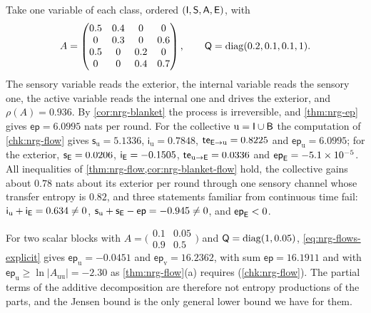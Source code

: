 \begin{example}\label{ex:nrg-blanket-instance}
Take one variable of each class, ordered $(\mathsf{I},\mathsf{S},\mathsf{A},\mathsf{E})$, with
\[
A=\begin{pmatrix}0.5&0.4&0&0\\0&0.3&0&0.6\\0.5&0&0.2&0\\0&0&0.4&0.7\end{pmatrix},\qquad\mathsf Q=\operatorname{diag}(0.2,0.1,0.1,1).
\]
The sensory variable reads the exterior, the internal variable reads the sensory one, the active variable reads the internal one and drives the exterior, and $\rho(A)=0.936$. By \cref{cor:nrg-blanket} the process is irreversible, and \cref{thm:nrg-ep} gives $\mathsf{ep}=6.0995$ nats per round. For the collective $\mathrm u=\mathsf{I}\cup\mathsf{B}$ the computation of \cref{chk:nrg-flow} gives $\mathsf s_{\mathrm u}=5.1336$, $\mathsf i_{\mathrm u}=0.7848$, $\mathsf{te}_{\mathsf{E}\to\mathrm u}=0.8225$ and $\mathsf{ep}_{\mathrm u}=6.0995$; for the exterior, $\mathsf s_{\mathsf{E}}=0.0206$, $\mathsf i_{\mathsf{E}}=-0.1505$, $\mathsf{te}_{\mathrm u\to\mathsf{E}}=0.0336$ and $\mathsf{ep}_{\mathsf{E}}=-5.1\times10^{-5}$. All inequalities of \cref{thm:nrg-flow,cor:nrg-blanket-flow} hold, the collective gains about $0.78$ nats about its exterior per round through one sensory channel whose transfer entropy is $0.82$, and three statements familiar from continuous time fail: $\mathsf i_{\mathrm u}+\mathsf i_{\mathsf{E}}=0.634\neq0$, $\mathsf s_{\mathrm u}+\mathsf s_{\mathsf{E}}-\mathsf{ep}=-0.945\neq0$, and $\mathsf{ep}_{\mathsf{E}}<0$.
\end{example}

\begin{example}\label{ex:nrg-negative-partial}
For two scalar blocks with $A=\bigl(\begin{smallmatrix}0.1&0.05\\0.9&0.5\end{smallmatrix}\bigr)$ and $\mathsf Q=\operatorname{diag}(1,0.05)$, \cref{eq:nrg-flows-explicit} gives $\mathsf{ep}_{\mathrm u}=-0.0451$ and $\mathsf{ep}_{\mathrm v}=16.2362$, with sum $\mathsf{ep}=16.1911$ and with $\mathsf{ep}_{\mathrm u}\ge\ln\vert A_{\mathrm{uu}}\vert=-2.30$ as \cref{thm:nrg-flow}(a) requires (\cref{chk:nrg-flow}). The partial terms of the additive decomposition are therefore not entropy productions of the parts, and the Jensen bound is the only general lower bound we have for them.
\end{example}


